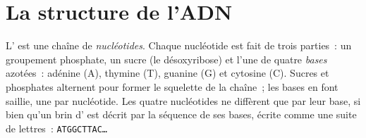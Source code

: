 \section{La structure de l'ADN}

\begin{definition}[Nucléotide]\label{def:g10:universal-dna:nucleotide}
L' est une chaîne de \emph{nucléotides}. Chaque
nucléotide est fait de trois parties~: un groupement phosphate, un
sucre (le désoxyribose) et l'une de quatre \emph{bases}
azotées~: adénine (A), thymine (T), guanine (G) et cytosine (C). Sucres
et phosphates alternent pour former le squelette de la chaîne~; les
bases en font saillie, une par nucléotide. Les quatre nucléotides ne
diffèrent que par leur base, si bien qu'un brin d' est décrit par la
séquence de ses bases, écrite comme une suite de lettres~:
\texttt{ATGGCTTAC\dots}
\end{definition}

